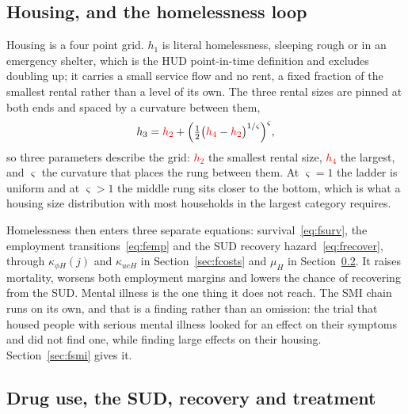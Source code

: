 \documentclass[10pt]{article}
\begin{document}
\subsection{Housing, and the homelessness loop}

Housing is a four point grid. $h_1$ is literal homelessness, sleeping rough or in
an emergency shelter, which is the HUD point-in-time definition and excludes
doubling up; it carries a small service flow and no rent, a fixed
fraction of the smallest rental rather than a level of its own. The three rental
sizes are pinned at both ends and spaced by a curvature between them,
\begin{equation}\label{eq:fhouse}
h_3=\textcolor{red}{h_2}+\Big(\tfrac{1}{2}\big(\textcolor{red}{h_4}-\textcolor{red}{h_2}\big)^{1/\varsigma}\Big)^{\varsigma},
\end{equation}
so three parameters describe the grid: \textcolor{red}{$h_2$} the smallest
rental size, \textcolor{red}{$h_4$} the largest, and $\varsigma$ the curvature that
places the rung between them. At $\varsigma=1$ the ladder is uniform and at
$\varsigma>1$ the middle rung sits closer to the bottom, which is what a housing
size distribution with most households in the largest category requires.

Homelessness then enters three separate equations: survival~\eqref{eq:fsurv},
the employment transitions~\eqref{eq:femp} and the SUD recovery
hazard~\eqref{eq:frecover}, through $\kappa_{\phi H}(j)$ and $\kappa_{ueH}$
in Section~\ref{sec:fcosts} and $\mu_H$ in Section~\ref{sec:fdrug}. It raises
mortality, worsens both employment margins and lowers the chance of
recovering from the SUD. Mental illness is the one thing it does not reach.
The SMI chain runs on its own, and that is a finding rather than an omission: the
trial that housed people with serious mental illness looked for an effect on
their symptoms and did not find one, while finding large effects on their
housing. Section~\ref{sec:fsmi} gives it.

\subsection{Drug use, the SUD, recovery and treatment}\label{sec:fdrug}
\end{document}
